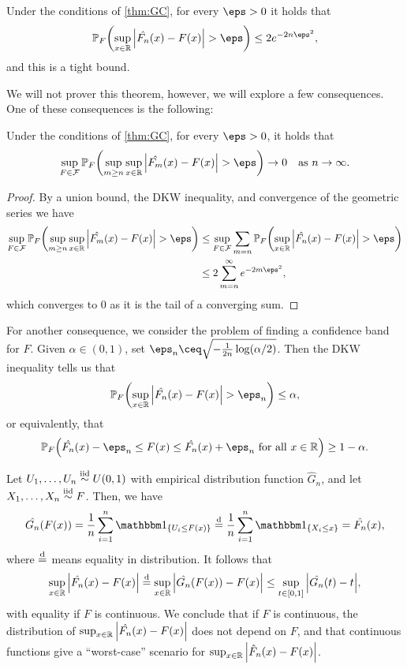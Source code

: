 \begin{theorem} 
    Under the conditions of \cref{thm:GC}, for every $\eps > 0$ it holds that
    \[
    \PP_F \qty(\sup_{x \in \RR} \abs{\hat{F_n}(x) - F(x)} > \eps) \leq 2e^{-2n\eps^2},
    \]
    and this is a tight bound. 
\end{theorem}

We will not prover this theorem, however, we will explore a few consequences. 
One of these consequences is the following: 

\begin{corollary} Under the conditions of \cref{thm:GC}, for every $\eps > 0$, it holds that
    \[
    \sup_{F \in \Cal F} \PP_F \qty(\sup_{m \geq n} \sup_{x \in \RR} \abs{\hat{F_m}(x) - F(x)} > \eps) \to 0 \quad\text{as $n \to\infty$.}
    \]
\end{corollary}

\begin{proof}
    By a union bound, the DKW inequality, and convergence of the geometric series we have
    \begin{align*}
    \sup_{F \in \Cal F} \PP_F \qty(\sup_{m \geq n} \sup_{x \in \RR} \abs{\hat{F_m}(x) - F(x)} > \eps) &\leq \sup_{F \in \Cal F} \sum_{m = n} \PP_F \qty(\sup_{x \in \RR} \abs{\hat{F_n}(x) - F(x)} > \eps) \\
    &\leq 2 \sum_{m=n}^\infty e^{-2m\eps^2},    \end{align*}
which converges to 0 as it is the tail of a converging sum. 
\end{proof}

\begin{consequence}
For another consequence, we consider the problem of finding a confidence band for $F$. Given $\alpha \in (0, 1)$, set $\eps_n \ceq \sqrt{-\frac1{2n}\log(\alpha/2)}$. Then the DKW inequality tells us that
\[
\PP_F \qty( \sup_{x \in \RR} \abs{\hat{F_n}(x) - F(x)} > \eps_n) \leq \alpha,
\]
or equivalently, that 
\[
\PP_F\qty(\hat{F_n}(x) - \eps_n \leq F(x) \leq \hat{F_n}(x) + \eps_n \ \text{for all $x \in \RR$}) \geq 1 - \alpha. 
\]
\end{consequence}

\begin{discussion}
Let $U_1, \dotsc, U_n \overset{\mathrm{iid}}{\sim} U(0, 1)$ with empirical distribution function $\hat{G}_n$, and let $X_1, \dotsc, X_n \overset{\mathrm{iid}}{\sim} F$. Then, we have
\begin{align*}
	\hat{G_n}(F(x)) = \frac1n \sum_{i=1}^n \ind_\qty{U_i \leq F(x)} \deq \frac1n \sum_{i=1}^n \ind_\qty{X_i \leq x} = \hat{F_n}(x), 
\end{align*}
where $\overset{\mathrm{d}}=$ means equality in distribution. It follows that
\[
\sup_{x \in \mathbb R} \abs{\hat{F_n}(x) - F(x)} \overset{\mathrm{d}}= \sup_{x \in \mathbb R} \abs{\hat{G_n}(F(x)) - F(x)} \leq \sup_{t \in [0, 1]} \abs{\hat{G_n}(t) - t},
\]
with equality if $F$ is continuous. We conclude that if $F$ is continuous, the distribution of $\sup_{x \in \mathbb R} \abs{\hat{F_n}(x) - F(x)}$ does not depend on $F$, and that continuous functions give a ``worst-case'' scenario for $\sup_{x \in \mathbb R} \abs{\hat F_n(x) - F(x)}$. 
\end{discussion}

